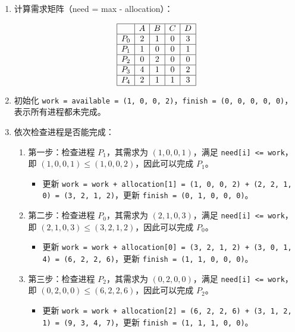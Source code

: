 \documentclass{article}
\begin{document}
\begin{enumerate}
	\item 计算需求矩阵（need = max - allocation）：
	
	$$
	\begin{array}{|c|c|c|c|c|}
		\hline
		& A & B & C & D \\
		\hline
		P_0 & 2 & 1 & 0 & 3 \\
		\hline
		P_1 & 1 & 0 & 0 & 1 \\
		\hline
		P_2 & 0 & 2 & 0 & 0 \\
		\hline
		P_3 & 4 & 1 & 0 & 2 \\
		\hline
		P_4 & 2 & 1 & 1 & 3 \\
		\hline
	\end{array}
	$$
	
	\item 
	初始化 \texttt{work = available = (1, 0, 0, 2)}，\texttt{finish = (0, 0, 0, 0, 0)}，表示所有进程都未完成。
	
	\item 
	依次检查进程是否能完成：
	
	\begin{enumerate}
		\item 第一步：检查进程 $P_1$，其需求为 $(1, 0, 0, 1)$，满足 \texttt{need[i] <= work}，即 $(1, 0, 0, 1) \leq (1, 0, 0, 2)$，因此可以完成 $P_1$。
		\begin{itemize}
			\item 更新 \texttt{work = work + allocation[1] = (1, 0, 0, 2) + (2, 2, 1, 0) = (3, 2, 1, 2)}，更新 \texttt{finish = (0, 1, 0, 0, 0)}。
		\end{itemize}
		
		\item 第二步：检查进程 $P_0$，其需求为 $(2, 1, 0, 3)$，满足 \texttt{need[i] <= work}，即 $(2, 1, 0, 3) \leq (3, 2, 1, 2)$，因此可以完成 $P_0$。
		\begin{itemize}
			\item 更新 \texttt{work = work + allocation[0] = (3, 2, 1, 2) + (3, 0, 1, 4) = (6, 2, 2, 6)}，更新 \texttt{finish = (1, 1, 0, 0, 0)}。
		\end{itemize}
		
		\item 第三步：检查进程 $P_2$，其需求为 $(0, 2, 0, 0)$，满足 \texttt{need[i] <= work}，即 $(0, 2, 0, 0) \leq (6, 2, 2, 6)$，因此可以完成 $P_2$。
		\begin{itemize}
			\item 更新 \texttt{work = work + allocation[2] = (6, 2, 2, 6) + (3, 1, 2, 1) = (9, 3, 4, 7)}，更新 \texttt{finish = (1, 1, 1, 0, 0)}。
		\end{itemize}
		

\end{enumerate}
\end{enumerate}
\end{document}
